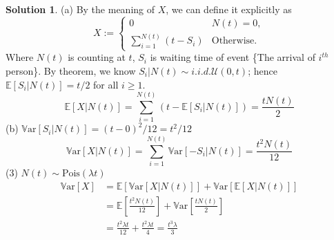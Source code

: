 \documentclass[a4paper, 10pt]{article}
\theoremstyle{definition}
\theoremstyle{hSol}
\newtheorem*{solution}{Solution}
\begin{document}
\begin{solution} (a) By the meaning of $X$, we can define it explicitly as
\begin{equation}
  X:=\begin{cases}
  0 & N(t)=0,\\
  \sum^{N(t)}_{i=1} (t-S_i) & \text{Otherwise.}
  \end{cases}
\end{equation}
Where $N(t)$ is counting at $t$, $S_i$ is waiting time of event \{The arrival of $i^{th}$ person\}. By theorem, we know $S_i|N(t)\sim i.i.d.\mathcal{U}(0,t)$; hence $\mathbb{E}\left[S_i|N(t)\right]=t/2$ for all $i\geq 1$.
\begin{equation}
    \mathbb{E}\left[X|N(t)\right]=\sum_{i=1}^{N(t)}\left(t- \mathbb{E}\left[S_i|N(t)\right]\right)=\frac{tN(t)}{2}
\end{equation}
(b) $\mathrm{\mathbb{V}ar}\left[S_i|N(t)\right]=(t-0)^2/12=t^2/12$
\begin{equation}
    \mathrm{\mathbb{V}ar}\left[X|N(t)\right] = \sum_{i=1}^{N(t)} \mathrm{\mathbb{V}ar}\left[-S_i|N(t)\right]=\frac{t^2N(t)}{12}
\end{equation}
(3) $N(t)\sim \text{Pois}(\lambda t)$
\begin{equation}
  \begin{split}
    \mathrm{\mathbb{V}ar}\left[X\right] &= \mathbb{E}\left[\mathrm{\mathbb{V}ar}\left[X|N(t)\right]\right] + \mathrm{\mathbb{V}ar}\left[\mathbb{E}\left[X|N(t)\right]\right]\\
    &= \mathbb{E}\left[\frac{t^2 N(t)}{12}\right] + \mathrm{\mathbb{V}ar}\left[\frac{tN(t)}{2}\right]\\
    &= \frac{t^2 \lambda t}{12} + \frac{t^2 \lambda t}{4} = \frac{t^3 \lambda}{3}
  \end{split}
\end{equation}
\end{solution}
\end{document}
